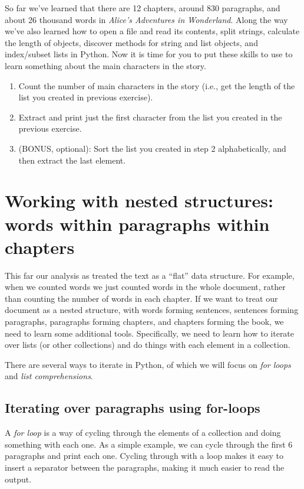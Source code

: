 \documentclass[]{book}
\begin{document}
So far we've learned that there are 12 chapters, around 830 paragraphs,
and about 26 thousand words in \emph{Alice's Adventures in Wonderland}.
Along the way we've also learned how to open a file and read its
contents, split strings, calculate the length of objects, discover
methods for string and list objects, and index/subset lists in Python.
Now it is time for you to put these skills to use to learn something
about the main characters in the story.

\begin{enumerate}
\def\labelenumi{\arabic{enumi}.}
\item
  Count the number of main characters in the story (i.e., get the length
  of the list you created in previous exercise).
\item
  Extract and print just the first character from the list you created
  in the previous exercise.
\item
  (BONUS, optional): Sort the list you created in step 2 alphabetically,
  and then extract the last element.
\end{enumerate}

\section{Working with nested structures: words within paragraphs within
chapters}\label{working-with-nested-structures-words-within-paragraphs-within-chapters}

This far our analysis as treated the text as a ``flat'' data structure.
For example, when we counted words we just counted words in the whole
document, rather than counting the number of words in each chapter. If
we want to treat our document as a nested structure, with words forming
sentences, sentences forming paragraphs, paragraphs forming chapters,
and chapters forming the book, we need to learn some additional tools.
Specifically, we need to learn how to iterate over lists (or other
collections) and do things with each element in a collection.

There are several ways to iterate in Python, of which we will focus on
\emph{for loops} and \emph{list comprehensions}.

\subsection{Iterating over paragraphs using
for-loops}\label{iterating-over-paragraphs-using-for-loops}

A \emph{for loop} is a way of cycling through the elements of a
collection and doing something with each one. As a simple example, we
can cycle through the first 6 paragraphs and print each one. Cycling
through with a loop makes it easy to insert a separator between the
paragraphs, making it much easier to read the output.
\end{document}
